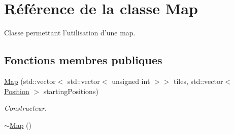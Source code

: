 \hypertarget{classMap}{\section{Référence de la classe Map}
\label{classMap}
}


Classe permettant l'utilisation d'une map.  


\subsection*{Fonctions membres publiques}
\begin{DoxyCompactItemize}
\item 
\hypertarget{classMap_ae50ababdf30fcb0f5a10d38c1984eb75}{\hyperlink{classMap_ae50ababdf30fcb0f5a10d38c1984eb75}{Map} (std\+::vector$<$ std\+::vector$<$ unsigned int $>$$>$ tiles, std\+::vector$<$ \hyperlink{classPosition}{Position} $>$ starting\+Positions)}\label{classMap_ae50ababdf30fcb0f5a10d38c1984eb75}

\begin{DoxyCompactList}\small\item\em Constructeur. \end{DoxyCompactList}\item 
\hypertarget{classMap_aa403fbe09394ccf39747588f5168e3b2}{\hyperlink{classMap_aa403fbe09394ccf39747588f5168e3b2}{$\sim$\+Map} ()}\label{classMap_aa403fbe09394ccf39747588f5168e3b2}


\end{DoxyCompactItemize}
